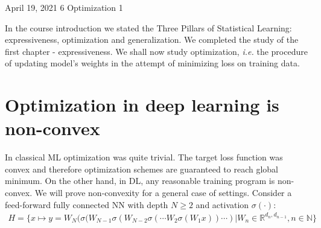 \documentclass[12pt]{article}
\newcommand{\ie}{{\it i.e. }}
\begin{document}
	
	{April 19, 2021}												%
	{6}																		 %
	{Optimization 1}			%
	
	\noindent
	In the course introduction we stated the Three Pillars of Statistical Learning: expressiveness, optimization and generalization.
	We completed the study of the first chapter - expressiveness.
	We shall now study optimization, \ie the procedure of updating model's weights in the attempt of minimizing loss on training data.
	
	
	\section{Optimization in deep learning is non-convex}
	In classical ML optimization was quite trivial. The target loss function was convex and therefore optimization schemes are guaranteed to reach global minimum.
	On the other hand, in DL, any reasonable training program is non-convex.
	We will prove non-convexity for a general case of settings. Consider a feed-forward fully connected NN with depth $N\geq2$ and activation $\sigma(\cdot)$:
	\begin{align} \label{eq:feed-forward fully connected NN}
		H = \{x \mapsto y = W_N(\sigma( W_{N-1}\sigma(W_{N-2}\sigma(\cdots W_2\sigma(W_1x))\cdots) | W_n\in\mathbb{R}^{d_n,d_{n-1}}, n\in\mathbb{N} \}
	\end{align}
	
\end{document}
